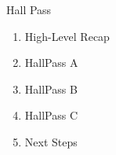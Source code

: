 




\begin{frame}{Hall Pass}
    \begin{enumerate}
        \item High-Level Recap
        \item HallPass A 
        \item HallPass B 
        \item HallPass C
        \item Next Steps
    \end{enumerate}
\end{frame}

